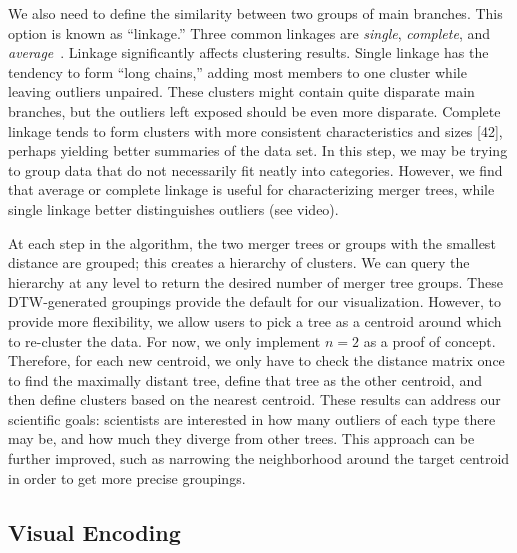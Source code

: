 We also need to define the similarity between two groups of main branches. This option is known as ``linkage.'' Three common linkages are \textit{single}, \textit{complete}, and \textit{average}~\cite{clusteringbook}. Linkage significantly affects clustering results. Single linkage has the tendency to form ``long chains,'' adding most members to one cluster while leaving outliers unpaired. These clusters might contain quite disparate main branches, but the outliers left exposed should be even more disparate. Complete linkage tends to form clusters with more consistent characteristics and sizes [42], perhaps yielding better summaries of the data set.
In this step, we may be trying to group data that do not necessarily fit neatly into categories. However, we find that average or complete linkage is useful for characterizing merger trees, while single linkage better distinguishes outliers (see video).

At each step in the algorithm, the two merger trees or groups with the smallest distance are grouped; this creates a hierarchy of clusters. We can query the hierarchy at any level to return the desired number of merger tree groups. These DTW-generated groupings provide the default for our visualization. However, to provide more flexibility, we allow users to pick a tree as a centroid around which to re-cluster the data.  For now, we only implement $n=2$ as a proof of concept. Therefore, for each new centroid, we only have to check the distance matrix once to find the maximally distant tree, define that tree as the other centroid, and then define clusters based on the nearest centroid. These results can address our scientific goals: scientists are interested in how many outliers of each type there may be, and how much they diverge from other trees.
This approach can be further improved, such as narrowing the neighborhood around the target centroid in order to get more precise groupings.


\subsection{Visual Encoding}
    
